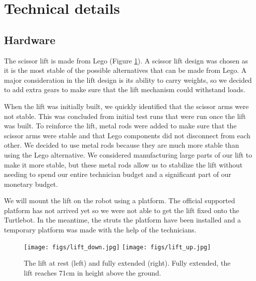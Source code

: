 \documentclass{article}
\begin{document}
\section{Technical details}
\subsection{Hardware}
\par The scissor lift is made from Lego (Figure \ref{fig:lift}). A scissor lift design was chosen as it is the most stable of the possible alternatives that can be made from Lego. A major consideration in the lift design is its ability to carry weights, so we decided to add extra gears to make sure that the lift mechanism could withstand loads. 
\par When the lift was initially built, we quickly identified that the scissor arms were not stable. This was concluded from initial test runs that were run once the lift was built. To reinforce the lift, metal rods were added to make sure that the scissor arms were stable and that Lego components did not disconnect from each other. We decided to use metal rods because they are much more stable than using the Lego alternative. We considered manufacturing large parts of our lift to make it more stable, but these metal rods allow us to stabilize the lift without needing to spend our entire technician budget and a significant part of our monetary budget. 
\par We will mount the lift on the robot using a platform. The official supported platform has not arrived yet so we were not able to get the lift fixed onto the Turtlebot. In the meantime, the struts the platform have been installed and a temporary platform was made with the help of the technicians.

\begin{figure}
  \begin{center}
    \texttt{[image: figs/lift\_down.jpg]}
    \texttt{[image: figs/lift\_up.jpg]}
    \caption{The lift at rest (left) and fully extended (right). Fully extended, the lift reaches 71cm in height above the ground.}
  \label{fig:lift}
  \end{center}
\end{figure}
\end{document}

